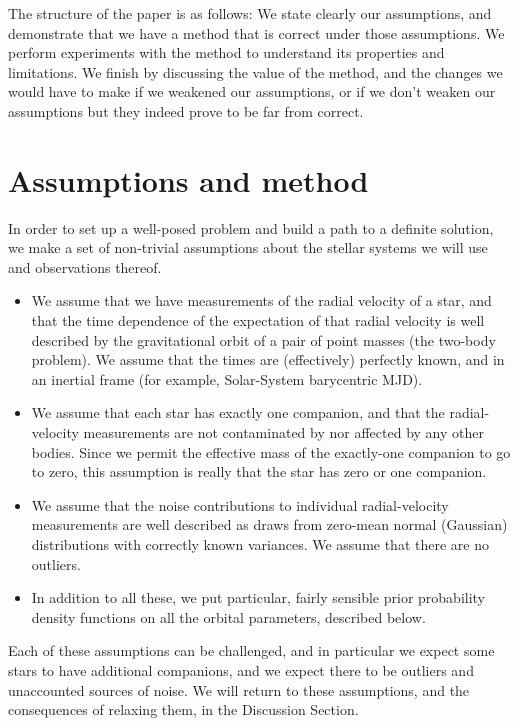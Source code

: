 \documentclass[manuscript, letterpaper]{aastex6}
\begin{document}
The structure of the paper is as follows:
We state clearly our assumptions, and demonstrate that we have a
method that is correct under those assumptions.
We perform experiments with the method to understand its properties
and limitations.
We finish by discussing the value of the method, and the changes we
would have to make if we weakened our assumptions, or if we don't
weaken our assumptions but they indeed prove to be far from correct.

\section{Assumptions and method} \label{sec:method}

In order to set up a well-posed problem and build a path to a
definite solution, we make a set of non-trivial assumptions about the
stellar systems we will use and observations thereof.
\begin{itemize}
\item We assume that we have measurements of the radial velocity of a
  star, and that the time dependence of the expectation of that radial
  velocity is well described by the gravitational orbit of a pair of
  point masses (the two-body problem). We assume that the times are
  (effectively) perfectly known, and in an inertial frame (for
  example, Solar-System barycentric MJD).
\item We assume that each star has exactly one companion, and that the
  radial-velocity measurements are not contaminated by nor affected by
  any other bodies. Since we permit the effective mass of the
  exactly-one companion to go to zero, this assumption is really that
  the star has zero or one companion.
\item We assume that the noise contributions to individual
  radial-velocity measurements are well described as draws from
  zero-mean normal (Gaussian) distributions with correctly known
  variances. We assume that there are no outliers.
\item In addition to all these, we put particular, fairly sensible
  prior probability density functions on all the orbital parameters,
  described below.
\end{itemize}
Each of these assumptions can be challenged, and in particular we
expect some stars to have additional companions, and we expect there
to be outliers and unaccounted sources of noise.
We will return to these assumptions, and the consequences of relaxing
them, in the Discussion Section.
\end{document}
